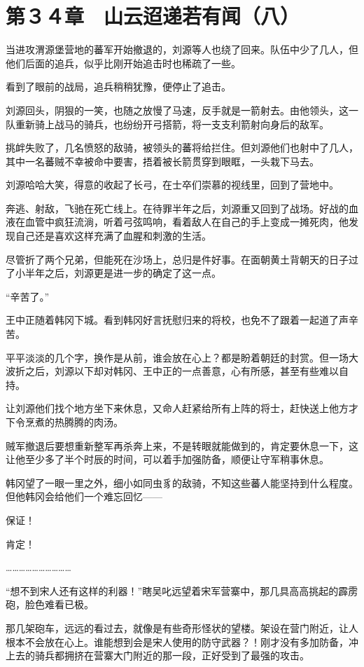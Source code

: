 \section{第３４章　山云迢递若有闻（八）}

当进攻渭源堡营地的蕃军开始撤退的，刘源等人也绕了回来。队伍中少了几人，但他们后面的追兵，似乎比刚开始追击时也稀疏了一些。

看到了眼前的战局，追兵稍稍犹豫，便停止了追击。

刘源回头，阴狠的一笑，也随之放慢了马速，反手就是一箭射去。由他领头，这一队重新骑上战马的骑兵，也纷纷开弓搭箭，将一支支利箭射向身后的敌军。

挑衅失败了，几名愤怒的敌骑，被领头的蕃将给拦住。但刘源他们也射中了几人，其中一名蕃贼不幸被命中要害，捂着被长箭贯穿到眼眶，一头栽下马去。

刘源哈哈大笑，得意的收起了长弓，在士卒们崇慕的视线里，回到了营地中。

奔逃、射敌，飞驰在死亡线上。在待罪半年之后，刘源重又回到了战场。好战的血液在血管中疯狂流淌，听着弓弦鸣响，看着敌人在自己的手上变成一摊死肉，他发现自己还是喜欢这样充满了血腥和刺激的生活。

尽管折了两个兄弟，但能死在沙场上，总归是件好事。在面朝黄土背朝天的日子过了小半年之后，刘源更是进一步的确定了这一点。

“辛苦了。”

王中正随着韩冈下城。看到韩冈好言抚慰归来的将校，也免不了跟着一起道了声辛苦。

平平淡淡的几个字，换作是从前，谁会放在心上？都是盼着朝廷的封赏。但一场大波折之后，刘源以下却对韩冈、王中正的一点善意，心有所感，甚至有些难以自持。

让刘源他们找个地方坐下来休息，又命人赶紧给所有上阵的将士，赶快送上他方才下令烹煮的热腾腾的肉汤。

贼军撤退后要想重新整军再杀奔上来，不是转眼就能做到的，肯定要休息一下，这让他至少多了半个时辰的时间，可以着手加强防备，顺便让守军稍事休息。

韩冈望了一眼一里之外，细小如同虫豸的敌骑，不知这些蕃人能坚持到什么程度。但他韩冈会给他们一个难忘回忆——

保证！

肯定！

…………………………

“想不到宋人还有这样的利器！”瞎吴叱远望着宋军营寨中，那几具高高挑起的霹雳砲，脸色难看已极。

那几架砲车，远远的看过去，就像是有些奇形怪状的望楼。架设在营门附近，让人根本不会放在心上。谁能想到会是宋人使用的防守武器？！刚才没有多加防备，冲上去的骑兵都拥挤在营寨大门附近的那一段，正好受到了最强的攻击。


